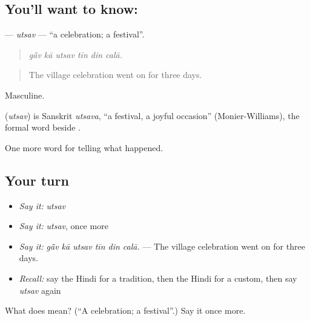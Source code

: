 \subsection*{You'll want to know: }
\textbf{} — \emph{utsav} — \textquotedblleft{}a celebration; a festival\textquotedblright{}.

\begin{quote}
     
\end{quote}

\begin{quote}
\emph{gā̃v kā utsav tīn din calā.}
\end{quote}

\begin{quote}
The village celebration went on for three days.
\end{quote}

Masculine.

\begin{cousinweb}
\textbf{} (\emph{utsav}) is Sanskrit \emph{utsava}, \textquotedblleft{}a festival, a joyful occasion\textquotedblright{} (Monier-Williams), the formal word beside \textbf{}.
\end{cousinweb}

\begin{grammarlens}[title={What you've built}]
One more word for telling what happened.
\end{grammarlens}

\subsection*{Your turn}
\begin{itemize}
\raggedright
  \item \emph{Say it:} \emph{utsav}
  \item \emph{Say it:} \emph{utsav}, once more
  \item \emph{Say it:} \emph{gā̃v kā utsav tīn din calā.} — The village celebration went on for three days.
  \item \emph{Recall:} say the Hindi for a tradition, then the Hindi for a custom, then say \emph{utsav} again
\end{itemize}

\begin{tcolorbox}[breakable,colback=teal!4,colframe=teal!35!black,title={Before you move on}]
What does  mean? (\textquotedblleft{}A celebration; a festival\textquotedblright{}.) Say it once more.
\end{tcolorbox}
